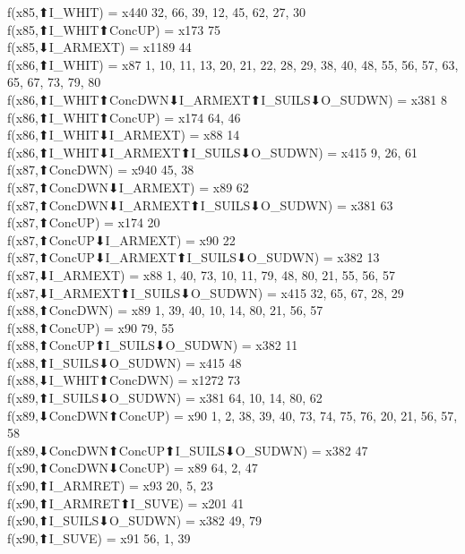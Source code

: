 f(x85,⬆I_WHIT) = x440 {32, 66, 39, 12, 45, 62, 27, 30} \\
f(x85,⬆I_WHIT⬆ConcUP) = x173 {75} \\
f(x85,⬇I_ARMEXT) = x1189 {44} \\
f(x86,⬆I_WHIT) = x87 {1, 10, 11, 13, 20, 21, 22, 28, 29, 38, 40, 48, 55, 56, 57, 63, 65, 67, 73, 79, 80} \\
f(x86,⬆I_WHIT⬆ConcDWN⬇I_ARMEXT⬆I_SUILS⬇O_SUDWN) = x381 {8} \\
f(x86,⬆I_WHIT⬆ConcUP) = x174 {64, 46} \\
f(x86,⬆I_WHIT⬇I_ARMEXT) = x88 {14} \\
f(x86,⬆I_WHIT⬇I_ARMEXT⬆I_SUILS⬇O_SUDWN) = x415 {9, 26, 61} \\
f(x87,⬆ConcDWN) = x940 {45, 38} \\
f(x87,⬆ConcDWN⬇I_ARMEXT) = x89 {62} \\
f(x87,⬆ConcDWN⬇I_ARMEXT⬆I_SUILS⬇O_SUDWN) = x381 {63} \\
f(x87,⬆ConcUP) = x174 {20} \\
f(x87,⬆ConcUP⬇I_ARMEXT) = x90 {22} \\
f(x87,⬆ConcUP⬇I_ARMEXT⬆I_SUILS⬇O_SUDWN) = x382 {13} \\
f(x87,⬇I_ARMEXT) = x88 {1, 40, 73, 10, 11, 79, 48, 80, 21, 55, 56, 57} \\
f(x87,⬇I_ARMEXT⬆I_SUILS⬇O_SUDWN) = x415 {32, 65, 67, 28, 29} \\
f(x88,⬆ConcDWN) = x89 {1, 39, 40, 10, 14, 80, 21, 56, 57} \\
f(x88,⬆ConcUP) = x90 {79, 55} \\
f(x88,⬆ConcUP⬆I_SUILS⬇O_SUDWN) = x382 {11} \\
f(x88,⬆I_SUILS⬇O_SUDWN) = x415 {48} \\
f(x88,⬇I_WHIT⬆ConcDWN) = x1272 {73} \\
f(x89,⬆I_SUILS⬇O_SUDWN) = x381 {64, 10, 14, 80, 62} \\
f(x89,⬇ConcDWN⬆ConcUP) = x90 {1, 2, 38, 39, 40, 73, 74, 75, 76, 20, 21, 56, 57, 58} \\
f(x89,⬇ConcDWN⬆ConcUP⬆I_SUILS⬇O_SUDWN) = x382 {47} \\
f(x90,⬆ConcDWN⬇ConcUP) = x89 {64, 2, 47} \\
f(x90,⬆I_ARMRET) = x93 {20, 5, 23} \\
f(x90,⬆I_ARMRET⬆I_SUVE) = x201 {41} \\
f(x90,⬆I_SUILS⬇O_SUDWN) = x382 {49, 79} \\
f(x90,⬆I_SUVE) = x91 {56, 1, 39} \\
